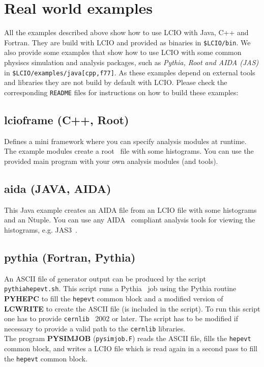 \documentclass[twoside]{article}
\begin{document}


\section{Real world examples} \label{realworld}
All the examples described above show how to use LCIO with Java, C++ and Fortran. They are build 
with LCIO and provided as binaries in \verb#$LCIO/bin#.
We also provide some examples that show how to use LCIO with some common physiscs simulation
and analysis packages, such as {\em  Pythia, Root and AIDA (JAS)} in 
\verb#$LCIO/examples/java[cpp,f77]#.
As these examples depend on external tools and libraries they are not build by default with LCIO.
Please check the corresponding \verb$README$ files for instructions on how to build these examples:


\subsection{lcioframe (C++, Root)} \label{rwlcioframe}

Defines a mini framework where you can specify analysis modules at 
runtime.
The example modules create a root~\cite{ref_root} file with some histograms. 
You can use the provided main program with your own analysis modules (and tools). 

\subsection{aida (JAVA, AIDA)} \label{rwaida}

This Java example creates an AIDA file from an LCIO file with some histograms
and an Ntuple. You can use any AIDA~\cite{ref_aida} compliant analysis tools for 
viewing the histograms, e.g. JAS3~\cite{ref_jas}.


\subsection{pythia (Fortran, Pythia)} \label{rwpythia}

An ASCII file of generator output can be produced by the script \verb$pythiahepevt.sh$.
This script runs a Pythia~\cite{ref_pythia} job
using the Pythia routine {\bf PYHEPC} to fill the \verb$hepevt$ common block 
and a modified version of {\bf LCWRITE} to create the ASCII file (is included in the script). To run this script
one has to provide \verb$cernlib$~\cite{ref_cernlib} 2002 or later. The script has to be modified if necessary
to provide a valid path to the \verb$cernlib$ libraries. \\
The program {\bf PYSIMJOB} (\verb$pysimjob.F$) reads the ASCII file, fills the \verb$hepevt$ common block, and writes
a LCIO file which is read again in a second pass to fill the \verb$hepevt$ common block.
\end{document}
